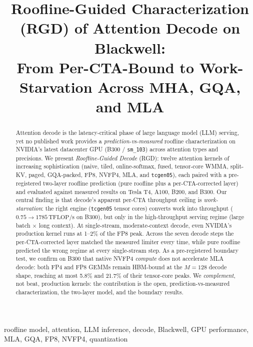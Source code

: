 \documentclass[conference]{IEEEtran}
\newcommand{\tflops}{\,\text{TFLOP/s}}
\begin{document}
\title{Roofline-Guided Characterization (RGD) of Attention Decode on Blackwell:\\
From Per-CTA-Bound to Work-Starvation Across MHA, GQA, and MLA}

\author{
}

\maketitle

\begin{abstract}
Attention decode is the latency-critical phase of large language model (LLM)
serving, yet no published work provides a \emph{prediction-vs-measured} roofline
characterization on NVIDIA's latest datacenter GPU (B300 / \texttt{sm\_103})
across attention types and precisions. We present \emph{Roofline-Guided Decode}
(RGD): twelve attention kernels of increasing sophistication (naive, tiled,
online-softmax, fused, tensor-core WMMA, split-KV, paged, GQA-packed, FP8,
NVFP4, MLA, and \texttt{tcgen05}), each paired with a pre-registered two-layer roofline
prediction (pure roofline plus a per-CTA-corrected layer) and evaluated against
measured results on Tesla T4, A100, B200, and B300. Our central finding is that decode's apparent per-CTA
throughput ceiling is \emph{work-starvation}: the right engine
(\texttt{tcgen05} tensor cores) converts work into throughput
($0.75 \to 1785\tflops$ on B300), but only in the high-throughput serving regime
(large batch $\times$ long context). At single-stream, moderate-context decode,
even NVIDIA's production kernel runs at 1--2\% of the FP8 peak. Across the seven
decode steps the per-CTA-corrected layer matched the measured limiter every time,
while pure roofline predicted the wrong regime at every single-stream step. As a
pre-registered boundary test, we confirm on B300 that native NVFP4 \emph{compute}
does not accelerate MLA decode: both FP4 and FP8 GEMMs remain HBM-bound at the
$M{=}128$ decode shape, reaching at most 5.8\% and 21.7\% of their tensor-core
peaks. We
\emph{complement}, not beat, production kernels: the contribution is the open,
prediction-vs-measured characterization, the two-layer model, and the boundary
results.
\end{abstract}

\begin{IEEEkeywords}
roofline model, attention, LLM inference, decode, Blackwell, GPU performance,
MLA, GQA, FP8, NVFP4, quantization
\end{IEEEkeywords}
\end{document}
